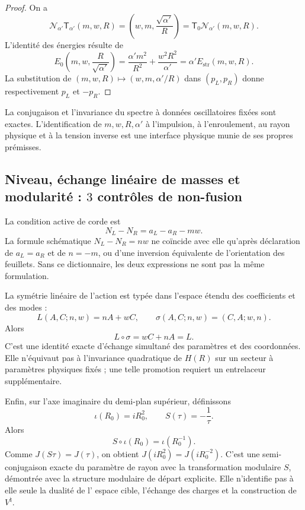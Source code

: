 \begin{proof}
On a
\[
 \mathcal N_{\alpha'}\mathsf T_{\alpha'}(m,w,R)
 =\left(w,m,\frac{\sqrt{\alpha'}}R\right)
 =\mathsf T_0\mathcal N_{\alpha'}(m,w,R).
\]
L'identité des énergies résulte de
\[
 E_0\!\left(m,w,\frac R{\sqrt{\alpha'}}\right)
 =\frac{\alpha'm^2}{R^2}+\frac{w^2R^2}{\alpha'}
 =\alpha' E_{\mathrm{str}}(m,w,R).
\]
La substitution de
\((m,w,R)\mapsto(w,m,\alpha'/R)\) dans \((p_L,p_R)\) donne respectivement
\(p_L\) et \(-p_R\).
\end{proof}

La conjugaison et l'invariance du spectre à données oscillatoires fixées sont
exactes. L'identification de \(m,w,R,\alpha'\) à l'impulsion, à l'enroulement,
au rayon physique et à la tension inverse est une interface physique munie de ses propres prémisses.

\subsection{Niveau, échange linéaire de masses et modularité : \(3\) contrôles de non-fusion}

La condition active de corde est
\[
 N_L-N_R=a_L-a_R-mw.
\]
La formule schématique \(N_L-N_R=nw\) ne coïncide avec elle
qu'après déclaration de \(a_L=a_R\) et de \(n=-m\), ou d'une inversion équivalente de
l'orientation des feuillets. Sans ce dictionnaire, les deux expressions ne sont pas la
même formulation.

La symétrie linéaire de l'action est typée dans l'espace étendu des
coefficients et des modes :
\[
 L(A,C;n,w)=nA+wC,
 \qquad
 \sigma(A,C;n,w)=(C,A;w,n).
\]
Alors
\[
 L\circ\sigma=wC+nA=L.
\]
C'est une identité exacte d'échange simultané des paramètres et des
coordonnées. Elle n'équivaut pas à l'invariance quadratique de \(H(R)\) sur un
secteur à paramètres physiques fixés ; une telle promotion requiert un
entrelaceur supplémentaire.

Enfin, sur l'axe imaginaire du demi-plan supérieur, définissons
\[
 \iota(R_0)=iR_0^2,
 \qquad S(\tau)=-\frac1\tau.
\]
Alors
\[
 \boxed{S\circ\iota(R_0)=\iota(R_0^{-1}).}
\]
Comme \(J(S\tau)=J(\tau)\), on obtient
\(J(iR_0^2)=J(iR_0^{-2})\). C'est une semi-conjugaison exacte du paramètre
de rayon avec la transformation modulaire \(S\), démontrée avec la structure
modulaire de départ explicite. Elle n'identifie pas à elle seule la dualité de l'
espace cible, l'échange des charges et la construction de
\(V^\natural\).
